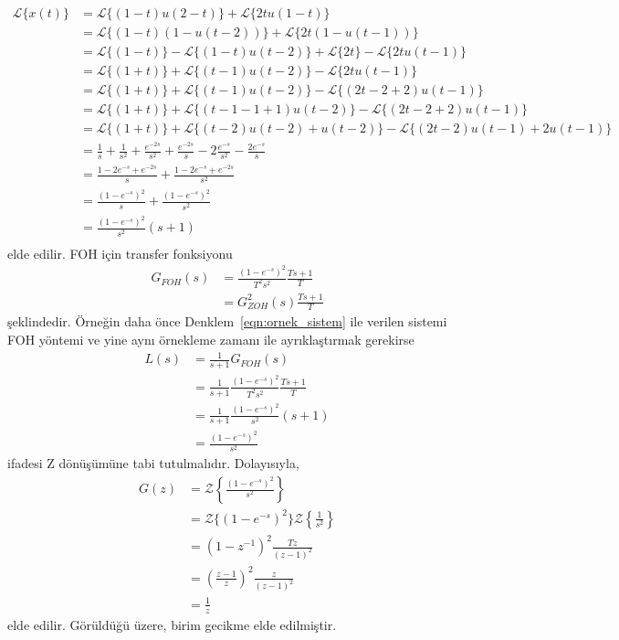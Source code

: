 \begin{equation}
\begin{split}
    \mathcal{L}\{x(t)\}&=\mathcal{L}\{(1-t)u(2-t)\}+\mathcal{L}\{2tu(1-t)\}\\
    &=\mathcal{L}\{(1-t)(1-u(t-2))\}+\mathcal{L}\{2t(1-u(t-1))\}\\
    &=\mathcal{L}\{(1-t)\}-\mathcal{L}\{(1-t)u(t-2)\}+\mathcal{L}\{2t\}-\mathcal{L}\{2tu(t-1)\}\\
    &=\mathcal{L}\{(1+t)\}+\mathcal{L}\{(t-1)u(t-2)\}-\mathcal{L}\{2tu(t-1)\}\\
    &=\mathcal{L}\{(1+t)\}+\mathcal{L}\{(t-1)u(t-2)\}-\mathcal{L}\{(2t-2+2)u(t-1)\}\\
    &=\mathcal{L}\{(1+t)\}+\mathcal{L}\{(t-1-1+1)u(t-2)\}-\mathcal{L}\{(2t-2+2)u(t-1)\}\\
    &=\mathcal{L}\{(1+t)\}+\mathcal{L}\{(t-2)u(t-2)+u(t-2)\}-\mathcal{L}\{(2t-2)u(t-1)+2u(t-1)\}\\
    &=\frac{1}{s}+\frac{1}{s^2}+\frac{e^{-2s}}{s^2}+\frac{e^{-2s}}{s}-2\frac{e^{-s}}{s^2}-\frac{2e^{-s}}{s}\\
    &=\frac{1-2e^{-s}+e^{-2s}}{s}+\frac{1-2e^{-s}+e^{-2s}}{s^2}\\
    &=\frac{(1-e^{-s})^2}{s}+\frac{(1-e^{-s})^2}{s^2}\\
    &=\frac{(1-e^{-s})^2}{s^2}(s+1)\\
\end{split}
\end{equation}
elde edilir. FOH için transfer fonksiyonu
\begin{equation}
    \begin{split}
        G_{FOH}(s)&=\frac{(1-e^{-s})^2}{T^2s^2}\frac{Ts+1}{T}\\
        &=G_{ZOH}^2(s)\frac{Ts+1}{T}
\end{split}
\end{equation}
şeklindedir. Örneğin daha önce Denklem~\ref{eqn:ornek_sistem} ile verilen sistemi FOH yöntemi ve yine aynı örnekleme zamanı ile ayrıklaştırmak gerekirse
\begin{equation}
\begin{split}
    L(s)&=\frac{1}{s+1}G_{FOH}(s)\\
    &=\frac{1}{s+1}\frac{(1-e^{-s})^2}{T^2s^2}\frac{Ts+1}{T}\\
    &=\frac{1}{s+1}\frac{(1-e^{-s})^2}{s^2}(s+1)\\
    &=\frac{(1-e^{-s})^2}{s^2}
\end{split}
\end{equation}
ifadesi Z dönüşümüne tabi tutulmalıdır. Dolayısıyla,
\begin{equation}
    \begin{split}
        G(z)&=\mathcal{Z}\left\{\frac{(1-e^{-s})^2}{s^2}\right\}\\
        &=\mathcal{Z}\{(1-e^{-s})^2\}\mathcal{Z}\left\{\frac{1}{s^2}\right\}\\
        &=\left(1-z^{-1}\right)^2\frac{Tz}{(z-1)^2}\\
        &=\left(\frac{z-1}{z}\right)^2\frac{z}{(z-1)^2}\\
        &=\frac{1}{z}
    \end{split}
\end{equation}
elde edilir. Görüldüğü üzere, birim gecikme elde edilmiştir.
